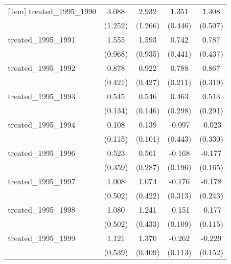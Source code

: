 {\begin{tabular}{l*{4}{c}}
[1em]
treated\_1995\_1990&       3.088\sym{*}  &       2.932\sym{*}  &       1.351\sym{**} &       1.308\sym{**} \\
            &     (1.252)         &     (1.266)         &     (0.446)         &     (0.507)         \\
[1em]
treated\_1995\_1991&       1.555         &       1.593         &       0.742         &       0.787         \\
            &     (0.968)         &     (0.935)         &     (0.441)         &     (0.437)         \\
[1em]
treated\_1995\_1992&       0.878\sym{*}  &       0.922\sym{*}  &       0.788\sym{***}&       0.867\sym{**} \\
            &     (0.421)         &     (0.427)         &     (0.211)         &     (0.319)         \\
[1em]
treated\_1995\_1993&       0.545\sym{***}&       0.546\sym{***}&       0.463         &       0.513         \\
            &     (0.134)         &     (0.146)         &     (0.298)         &     (0.291)         \\
[1em]
treated\_1995\_1994&       0.108         &       0.139         &      -0.097         &      -0.023         \\
            &     (0.115)         &     (0.101)         &     (0.443)         &     (0.330)         \\
[1em]
treated\_1995\_1996&       0.523         &       0.561         &      -0.168         &      -0.177         \\
            &     (0.359)         &     (0.287)         &     (0.196)         &     (0.165)         \\
[1em]
treated\_1995\_1997&       1.008\sym{*}  &       1.074\sym{*}  &      -0.176         &      -0.178         \\
            &     (0.502)         &     (0.422)         &     (0.313)         &     (0.243)         \\
[1em]
treated\_1995\_1998&       1.080\sym{*}  &       1.241\sym{**} &      -0.151         &      -0.177         \\
            &     (0.502)         &     (0.433)         &     (0.109)         &     (0.115)         \\
[1em]
treated\_1995\_1999&       1.121\sym{*}  &       1.370\sym{***}&      -0.262\sym{*}  &      -0.229         \\
            &     (0.539)         &     (0.409)         &     (0.113)         &     (0.152)         \\

\end{tabular}}
